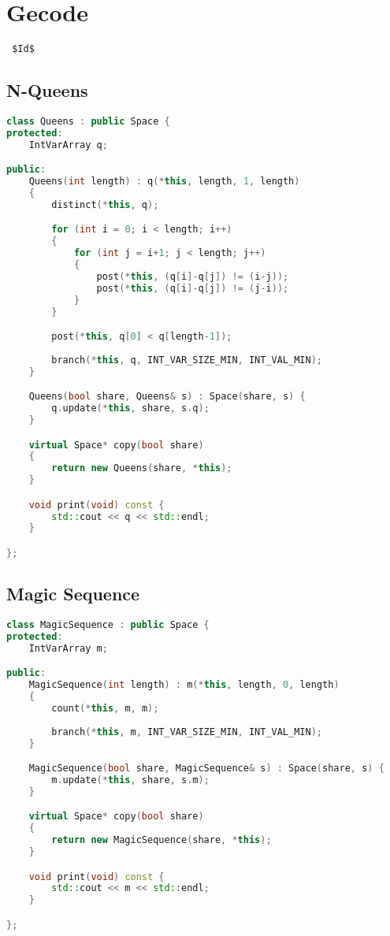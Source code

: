 \section{Gecode}
\verb= $Id$ =

\subsection{N-Queens}
\begin{lstlisting}[language=C++]
class Queens : public Space {
protected: 
	IntVarArray q;

public:
	Queens(int length) : q(*this, length, 1, length)
	{
		distinct(*this, q);

		for (int i = 0; i < length; i++)
		{
			for (int j = i+1; j < length; j++)
			{
				post(*this, (q[i]-q[j]) != (i-j));
				post(*this, (q[i]-q[j]) != (j-i));
			}
		}

		post(*this, q[0] < q[length-1]);
		
		branch(*this, q, INT_VAR_SIZE_MIN, INT_VAL_MIN);
	}

	Queens(bool share, Queens& s) : Space(share, s) {
		q.update(*this, share, s.q);
	}

	virtual Space* copy(bool share)
	{
		return new Queens(share, *this);
	}

	void print(void) const {
		std::cout << q << std::endl;
	}

};
\end{lstlisting}

\subsection{Magic Sequence}
\begin{lstlisting}[language=C++]
class MagicSequence : public Space {
protected: 
	IntVarArray m;

public:
	MagicSequence(int length) : m(*this, length, 0, length)
	{
		count(*this, m, m);
		
		branch(*this, m, INT_VAR_SIZE_MIN, INT_VAL_MIN);
	}

	MagicSequence(bool share, MagicSequence& s) : Space(share, s) {
		m.update(*this, share, s.m);
	}

	virtual Space* copy(bool share)
	{
		return new MagicSequence(share, *this);
	}

	void print(void) const {
		std::cout << m << std::endl;
	}

};
\end{lstlisting}

